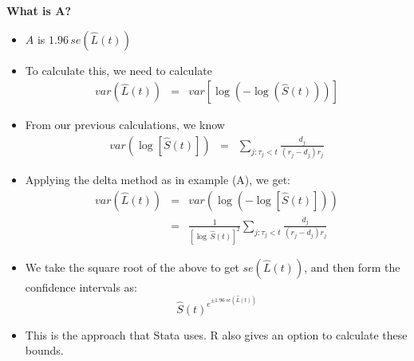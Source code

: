\documentclass[11pt,slidesonly,semrot,portrait,palatino]{book}
\begin{document}
{\bf What is A?}
\begin{itemize}
\item $A$ is $1.96 \, se(\hat{L}(t))$
\item To calculate this, we need to calculate
\begin{eqnarray*}
var(\hat{L}(t)) & = & var\left[\log(-\log(\hat{S}(t)))\right]
\end{eqnarray*}
\item From our previous calculations, we know
\begin{eqnarray*}
var(\log[\hat{S}(t)]) & = &
     \sum_{j: \tau_j < t} \frac{d_j}{(r_j-d_j) r_j}
\end{eqnarray*}

\item Applying the delta method as in example (A), we get:
\begin{eqnarray*}
var(\hat{L}(t))& = & var(\log(-\log[\hat{S}(t)])) \\ & = &
\frac{1}{[\log \,\hat{S}(t)]^2} \sum_{j: \tau_j < t} \frac{d_j}{(r_j-d_j) r_j}
\end{eqnarray*}
\item We take the square root of the above to get $se(\hat{L}(t))$,
and then form the confidence intervals as:
$$\hat{S}(t)^{e^{\pm 1.96 \, se(\hat{L}(t)) }}$$
\item This is the approach that Stata uses.  R also
gives an option to calculate these bounds.
\end{itemize}
\end{document}
